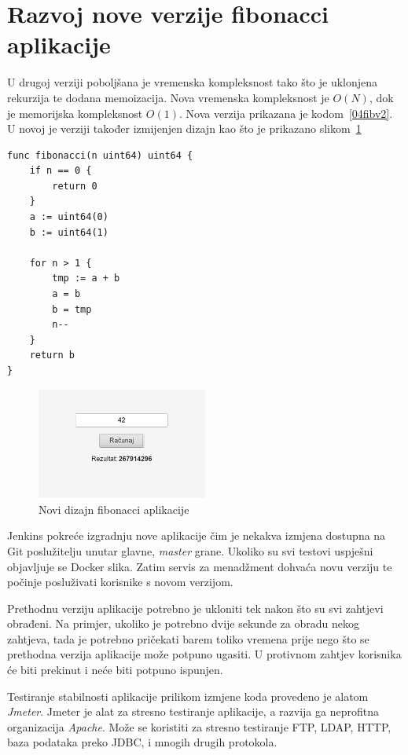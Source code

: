\section{Razvoj nove verzije fibonacci aplikacije}
U drugoj verziji poboljšana je vremenska kompleksnost tako što je uklonjena rekurzija te dodana
memoizacija. Nova vremenska kompleksnost je $O(N)$, dok je memorijska kompleksnost $O(1)$. Nova
verzija prikazana je kodom~\ref{04fibv2}. U novoj je verziji također izmijenjen dizajn kao što je
prikazano slikom~\ref{fig:04redesign}

\begin{lstlisting}[float=h]
func fibonacci(n uint64) uint64 {
	if n == 0 {
		return 0
	}
	a := uint64(0)
	b := uint64(1)

	for n > 1 {
		tmp := a + b
		a = b
		b = tmp
		n--
	}
	return b
}
\end{lstlisting}

\begin{figure}[h]
    \centering
    \includegraphics[width=0.5\textwidth]{img/04/new_app.png}
    \caption{Novi dizajn fibonacci aplikacije}%
    \label{fig:04redesign}
\end{figure}

Jenkins pokreće izgradnju nove aplikacije čim je nekakva izmjena dostupna na Git poslužitelju unutar
glavne, \textit{master} grane. Ukoliko su svi testovi uspješni objavljuje se Docker slika. Zatim
servis za menadžment dohvaća novu verziju te počinje posluživati korisnike s novom verzijom.

Prethodnu verziju aplikacije potrebno je ukloniti tek nakon što su svi zahtjevi obrađeni. Na
primjer, ukoliko je potrebno dvije sekunde za obradu nekog zahtjeva, tada je potrebno pričekati
barem toliko vremena prije nego što se prethodna verzija aplikacije može potpuno ugasiti.  U
protivnom zahtjev korisnika će biti prekinut i neće biti potpuno ispunjen.

Testiranje stabilnosti aplikacije prilikom izmjene koda provedeno je alatom \textit{Jmeter}. Jmeter
je alat za stresno testiranje aplikacije, a razvija ga neprofitna organizacija \textit{Apache}. Može
se koristiti za stresno testiranje FTP, LDAP, HTTP, baza podataka preko JDBC, i mnogih drugih
protokola.

